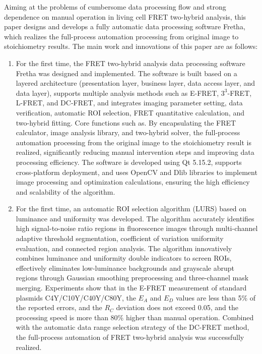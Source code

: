 \begin{eabstract}
Aiming at the problems of cumbersome data processing flow and strong dependence on manual operation in living cell FRET two-hybrid analysis, this paper designs and develops a fully automatic data processing software Fretha, which realizes the full-process automation processing from original image to stoichiometry results.
The main work and innovations of this paper are as follows:
\begin{enumerate}
  \item For the first time, the FRET two-hybrid analysis data processing software Fretha was designed and implemented. The software is built based on a layered architecture (presentation layer, business layer, data access layer, and data layer), supports multiple analysis methods such as E-FRET, $3^3$-FRET, L-FRET, and DC-FRET, and integrates imaging parameter setting, data verification, automatic ROI selection, FRET quantitative calculation, and two-hybrid fitting. Core functions such as. By encapsulating the FRET calculator, image analysis library, and two-hybrid solver, the full-process automation processing from the original image to the stoichiometry result is realized, significantly reducing manual intervention steps and improving data processing efficiency. The software is developed using Qt 5.15.2, supports cross-platform deployment, and uses OpenCV and Dlib libraries to implement image processing and optimization calculations, ensuring the high efficiency and scalability of the algorithm.
  \item For the first time, an automatic ROI selection algorithm (LURS) based on luminance and uniformity was developed. The algorithm accurately identifies high signal-to-noise ratio regions in fluorescence images through multi-channel adaptive threshold segmentation, coefficient of variation uniformity evaluation, and connected region analysis. The algorithm innovatively combines luminance and uniformity double indicators to screen ROIs, effectively eliminates low-luminance backgrounds and grayscale abrupt regions through Gaussian smoothing preprocessing and three-channel mask merging. Experiments show that in the E-FRET measurement of standard plasmids C4Y/C10Y/C40Y/C80Y, the $E_{A}$ and $E_{D}$ values are less than 5\% of the reported errors, and the $R_{C}$ deviation does not exceed 0.05, and the processing speed is more than 80\% higher than manual operation. Combined with the automatic data range selection strategy of the DC-FRET method, the full-process automation of FRET two-hybrid analysis was successfully realized.

\end{enumerate}
\end{eabstract}
